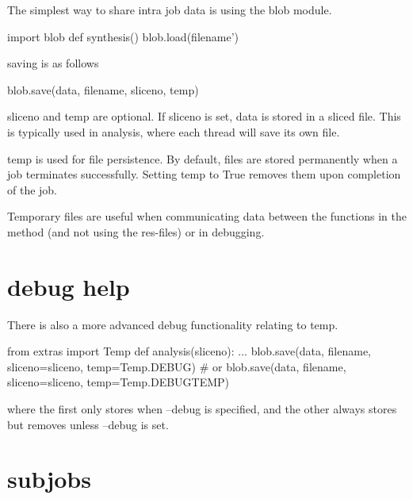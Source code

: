 The simplest way to share intra job data is using the blob module.

\begin{python}
import blob
def synthesis()
  blob.load(filename')
\end{python}

saving is as follows
\begin{python}
  blob.save(data, filename, sliceno, temp)
\end{python}
sliceno and temp are optional.  If sliceno is set, data is stored in a
sliced file.  This is typically used in analysis, where each thread
will save its own file.

temp is used for file persistence.  By default, files are stored
permanently when a job terminates successfully.  Setting temp to True
removes them upon completion of the job.

Temporary files are useful when communicating data between the
functions in the method (and not using the res-files) or in debugging.

\section{debug help}
There is also a more advanced debug functionality relating to temp.

\begin{python}
from extras import Temp
def analysis(sliceno):
  ...
  blob.save(data, filename, sliceno=sliceno, temp=Temp.DEBUG)
  # or
  blob.save(data, filename, sliceno=sliceno, temp=Temp.DEBUGTEMP)
\end{python}
where the first only stores when --debug is specified, and the other
always stores but removes unless --debug is set.



\section{subjobs}
